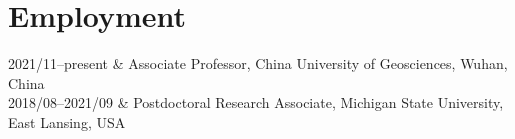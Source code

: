 \section{Employment}

\begin{EntriesTable}{0.18}{0.02}{0.80}
2021/11--present & Associate Professor, China University of Geosciences, Wuhan, China \\
2018/08--2021/09 & Postdoctoral Research Associate, Michigan State University, East Lansing, USA \\
\end{EntriesTable}
